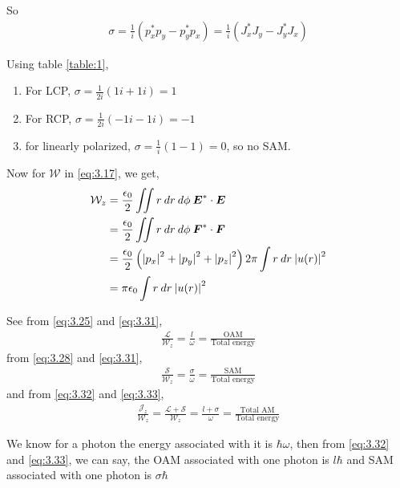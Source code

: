 \documentclass[11pt,a4paper]{article}
\numberwithin{equation}{section}
\begin{document}
So
\begin{align}
	\sigma = \frac{1}{i}(p_x^\ast p_y- p_y^\ast p_x)
	=\frac{1}{i}(J_x^\ast J_y- J_y^\ast J_x)
\end{align}

Using table \ref{table:1},
\begin{enumerate}
	\item For LCP, $\sigma = \frac{1}{2i}(1i+1i)=1$
	\item For RCP, $\sigma = \frac{1}{2i}(-1i-1i)=-1$
	\item for linearly polarized, $\sigma = \frac{1}{i}(1-1)=0$, so no SAM.
\end{enumerate}

Now for $\mathcal{W}$ in \ref{eq:3.17}, we get,
\begin{align}
	\mathcal{W}_z &=\frac{\epsilon_0}{2}\iint r\:dr\:d\phi\: \boldsymbol{E}^\ast\cdot\boldsymbol{E}\nonumber\\
	&= \frac{\epsilon_0}{2}\iint r\:dr\:d\phi\: \boldsymbol{F}^\ast\cdot\boldsymbol{F}\nonumber\\
	&=\frac{\epsilon_0}{2} \left(\abs{p_x}^2+\abs{p_y}^2+\abs{p_z}^2\right) 2\pi\int r\:dr\:\abs{u(r)}^2\nonumber\\
	&=\pi\epsilon_0\int r\:dr\:\abs{u(r)}^2 \label{eq:3.31}
\end{align}

See from \ref{eq:3.25} and \ref{eq:3.31}, 
\begin{align}
	\frac{\mathcal{L}}{\mathcal{W}_z} = \frac{l}{\omega} =\frac{\text{OAM}}{\text{Total energy}} \label{eq:3.32}
\end{align}
from \ref{eq:3.28} and \ref{eq:3.31},
\begin{align}
	\frac{\mathcal{S}}{\mathcal{W}_z} = \frac{\sigma}{\omega} =\frac{\text{SAM}}{\text{Total energy}}\label{eq:3.33}
\end{align}
and from \ref{eq:3.32} and \ref{eq:3.33},
\begin{align}
	\frac{\mathcal{J}_z}{\mathcal{W}_z} = \frac{\mathcal{L}+\mathcal{S}}{\mathcal{W}_z} = \frac{l+\sigma}{\omega} =\frac{\text{Total AM}}{\text{Total energy}} \label{eq:3.34}
\end{align}

We know for a photon the energy associated with it is $\hbar\omega$, then from \ref{eq:3.32} and \ref{eq:3.33}, we can say, the OAM associated with one photon is $l\hbar$ and SAM associated with one photon is $\sigma\hbar$
\end{document}
